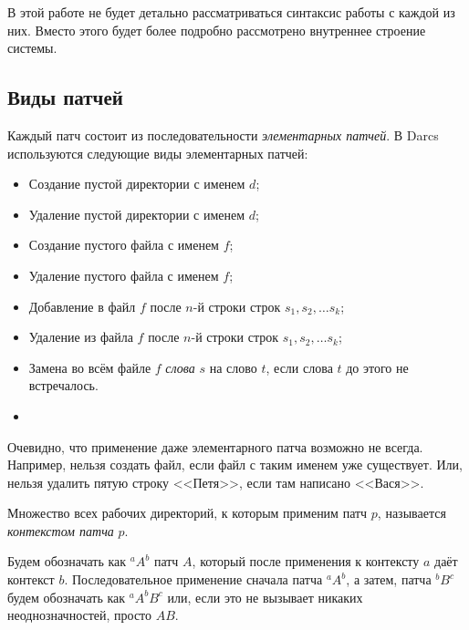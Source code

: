 В этой работе не будет детально рассматриваться синтаксис работы с
каждой из них. Вместо этого будет более подробно рассмотрено
внутреннее строение системы.

\subsection{Виды патчей}

Каждый патч состоит из последовательности \emph{элементарных патчей}. 
В Darcs используются следующие виды элементарных патчей:

\begin{definition}
\begin{itemize}
\item Создание пустой директории с именем $d$;
\item Удаление пустой директории с именем $d$;
\item Создание пустого файла с именем $f$;
\item Удаление пустого файла с именем $f$;
\item Добавление в файл $f$ после $n$-й строки строк $s_1, s_2, \ldots s_k$;
\item Удаление из файла $f$ после $n$-й строки строк $s_1, s_2, \ldots s_k$;
\item Замена во всём файле $f$ \emph{слова} $s$ на слово $t$, если
  слова $t$ до этого не встречалось.
\item 
\end{itemize}
\end{definition}

Очевидно, что применение даже элементарного патча возможно не всегда.
Например, нельзя создать файл, если файл с таким именем уже
существует. Или, нельзя удалить пятую строку <<Петя>>, если там
написано <<Вася>>.

\begin{definition}[Контекст]
  Множество всех рабочих директорий, к которым применим патч $p$,
  называется \emph{контекстом патча} $p$.
\end{definition}

\begin{notation}
  Будем обозначать как ${}^aA^b$ патч $A$, который после применения к
  контексту $a$ даёт контекст $b$. Последовательное применение сначала
  патча ${}^aA^b$, а затем, патча ${}^bB^c$ будем обозначать как
  ${}^aA^bB^c$ или, если это не вызывает никаких неоднозначностей,
  просто $AB$. 
\end{notation}

